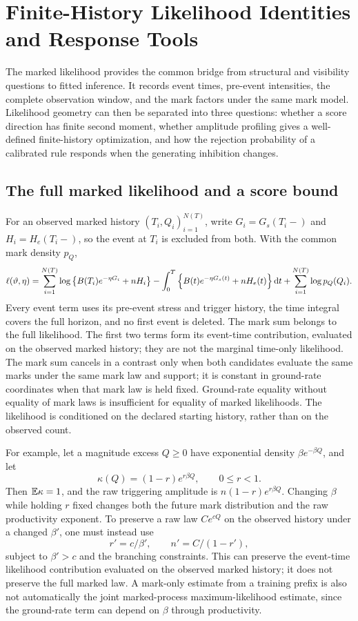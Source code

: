 \chapter{Finite-History Likelihood Identities and Response Tools}\label{chap:inference}\label{ch:inference}

The marked likelihood provides the common bridge from structural and visibility questions to fitted inference. It records event times, pre-event intensities, the complete observation window, and the mark factors under the same mark model. Likelihood geometry can then be separated into three questions: whether a score direction has finite second moment, whether amplitude profiling gives a well-defined finite-history optimization, and how the rejection probability of a calibrated rule responds when the generating inhibition changes.

\section{The full marked likelihood and a score bound}

For an observed marked history \((T_i,Q_i)_{i=1}^{N(T)}\), write \(G_i=G_s(T_i-)\) and \(H_i=H_e(T_i-)\), so the event at \(T_i\) is excluded from both. With the common mark density \(p_Q\),
\begin{equation}
\ell(\vartheta,\eta)
=
\sum_{i=1}^{N(T)}
\log\left\{B(T_i)e^{-\eta G_i}+nH_i\right\}
-\int_0^T\left\{B(t)e^{-\eta G_s(t)}+nH_e(t)\right\}\mathop{}\!\mathrm{d} t
+\sum_{i=1}^{N(T)}\log p_Q(Q_i).
\label{eq:full-likelihood}
\end{equation}
Every event term uses its pre-event stress and trigger history, the time integral covers the full horizon, and no first event is deleted. The mark sum belongs to the full likelihood. The first two terms form its event-time contribution, evaluated on the observed marked history; they are not the marginal time-only likelihood. The mark sum cancels in a contrast only when both candidates evaluate the same marks under the same mark law and support; it is constant in ground-rate coordinates when that mark law is held fixed. Ground-rate equality without equality of mark laws is insufficient for equality of marked likelihoods. The likelihood is conditioned on the declared starting history, rather than on the observed count.

For example, let a magnitude excess \(Q\ge0\) have exponential density \(\beta e^{-\beta Q}\), and let
\[
\kappa(Q)=(1-r)e^{r\beta Q},\qquad 0\le r<1.
\]
Then \(\mathbb{E} \kappa=1\), and the raw triggering amplitude is
\(n(1-r)e^{r\beta Q}\). Changing \(\beta\) while holding \(r\) fixed changes both the future mark distribution and the raw productivity exponent. To preserve a raw law \(C e^{cQ}\) on the observed history under a changed \(\beta'\), one must instead use
\[
r'=c/\beta',\qquad n'=C/(1-r'),
\]
subject to \(\beta'>c\) and the branching constraints. This can preserve the event-time likelihood contribution evaluated on the observed marked history; it does not preserve the full marked law. A mark-only estimate from a training prefix is also not automatically the joint marked-process maximum-likelihood estimate, since the ground-rate term can depend on \(\beta\) through productivity.


